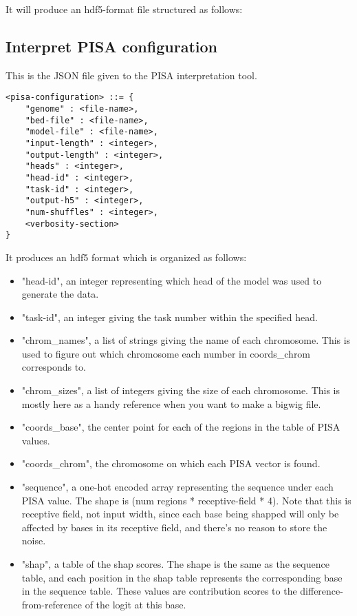 \documentclass{article}
\begin{document}
It will produce an hdf5-format file structured as follows:


\subsection{Interpret PISA configuration}

This is the JSON file given to the PISA interpretation tool. 
\begin{lstlisting}
<pisa-configuration> ::= {
    "genome" : <file-name>,
    "bed-file" : <file-name>,
    "model-file" : <file-name>,
    "input-length" : <integer>,
    "output-length" : <integer>,
    "heads" : <integer>,
    "head-id" : <integer>,
    "task-id" : <integer>,
    "output-h5" : <integer>,
    "num-shuffles" : <integer>,
    <verbosity-section>
}
\end{lstlisting}

It produces an hdf5 format which is organized as follows:
\begin{itemize}
    \item "head-id", an integer representing which head of the model was used to generate the data.
    \item "task-id", an integer giving the task number within the specified head. 
    \item "chrom\_names", a list of strings giving the name of each chromosome. This is used to figure out which chromosome each number in coords\_chrom corresponds to. 
    \item "chrom\_sizes", a list of integers giving the size of each chromosome. This is mostly here as a handy reference when you want to make a bigwig file. 
    \item "coords\_base", the center point for each of the regions in the table of PISA values. 
    \item "coords\_chrom", the chromosome on which each PISA vector is found. 
    \item "sequence", a one-hot encoded array representing the sequence under each PISA value. The shape is (num regions * receptive-field * 4). Note that this is receptive field, not input width, since each base being shapped will only be affected by bases in its receptive field, and there's no reason to store the noise. 
    \item "shap", a table of the shap scores. The shape is the same as the sequence table, and each position in the shap table represents the corresponding base in the sequence table. These values are contribution scores to the difference-from-reference of the logit at this base. 

\end{itemize}
\end{document}

